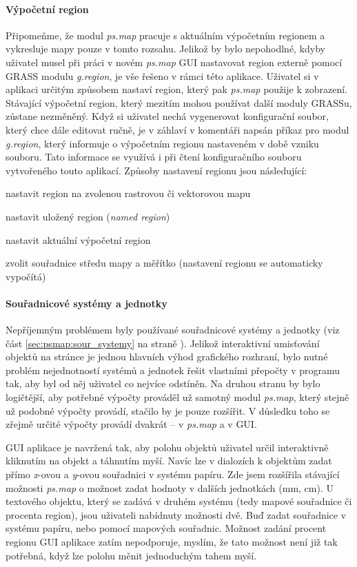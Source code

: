 \documentclass[a4paper,12pt,draft]{article}
\newcommand{\modul}[1]{\emph{#1}}
\begin{document}
\paragraph*{Výpočetní region} Připomeňme, že modul \modul{ps.map} pracuje s aktuálním výpočetním regionem a vykresluje mapy pouze v tomto rozsahu. Jelikož by bylo nepohodlné, kdyby uživatel musel při práci v novém \modul{ps.map} GUI nastavovat region externě pomocí GRASS modulu \modul{g.region}, je vše řešeno v rámci této aplikace. Uživatel si v aplikaci určitým způsobem nastaví region, který pak \modul{ps.map} použije k zobrazení. Stávající výpočetní region, který mezitím mohou používat další moduly GRASSu, zůstane nezměněný. Když si uživatel nechá vygenerovat konfigurační soubor, který chce dále editovat ručně, je v záhlaví v komentáři napsán příkaz pro modul \modul{g.region}, který informuje o výpočetním regionu nastaveném v době vzniku souboru. Tato informace se využívá i při čtení konfiguračního souboru vytvořeného touto aplikací.  Způsoby nastavení regionu jsou následující:
\begin{enumerate*}
    \item nastavit region na zvolenou rastrovou či vektorovou mapu
    \item nastavit uložený region (\emph{named region})
    \item nastavit aktuální výpočetní region
    \item zvolit souřadnice středu mapy a měřítko (nastavení regionu se automaticky vypočítá)
\end{enumerate*}


\paragraph*{Souřadnicové systémy a jednotky} Nepříjemným problémem byly používané souřadnicové systémy a jednotky (viz část \ref{sec:psmap:sour_systemy} na straně \pageref{sec:psmap:sour_systemy}).
 Jelikož interaktivní umisťování objektů na stránce je jednou hlavních výhod grafického rozhraní, bylo nutné problém nejednotností systémů a jednotek řešit vlastními přepočty v programu tak, aby byl od něj uživatel co nejvíce odstíněn. Na druhou stranu by bylo logičtější, aby potřebné výpočty prováděl už samotný modul \modul{ps.map}, který stejně už podobné výpočty provádí, stačilo by je pouze rozšířit. V důsledku toho se zřejmě určité výpočty provádí dvakrát -- v \modul{ps.map} a v GUI.
 
 GUI aplikace je navržená tak, aby polohu objektů uživatel určil interaktivně kliknutím na objekt a táhnutím myší. Navíc lze v dialozích k objektům zadat přímo \emph{x}-ovou a \emph{y}-ovou souřadnici v systému papíru. Zde jsem rozšířila stávající možnosti \modul{ps.map} o možnost zadat hodnoty v dalších jednotkách (mm, cm).  U textového objektu, který se zadává v druhém systému (tedy mapové souřadnice či procenta region), jsou uživateli nabídnuty možnosti dvě. Buď zadat souřadnice v systému papíru, nebo pomocí mapových souřadnic. Možnost zadání procent regionu GUI aplikace zatím nepodporuje, myslím, že tato možnost není již tak potřebná, když lze polohu měnit jednoduchým tahem myší. 
 
\end{document}
